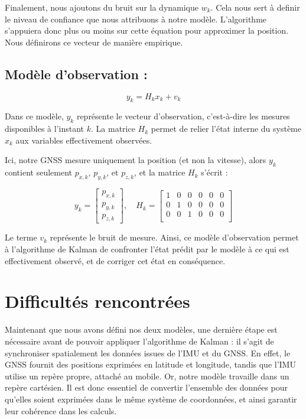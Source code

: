 Finalement, nous ajoutons du bruit sur la dynamique \( w_k \). Cela nous sert à definir le niveau de confiance que nous attribuons à notre modèle. L'algorithme s'appuiera donc plus ou moins sur cette équation pour approximer la position. Nous définirons ce vecteur de manière empirique.

\subsection*{Modèle d’observation :}
\[
y_k = H_k x_k + v_k
\]

Dans ce modèle, \( y_k \) représente le vecteur d'observation, c’est-à-dire les mesures disponibles à l’instant \( k \). 
La matrice \( H_k \) permet de relier l’état interne du système \( x_k \) aux variables effectivement observées.

Ici, notre GNSS mesure uniquement la position (et non la vitesse), alors \( y_k \) contient seulement \( p_{x,k} \), \( p_{y,k} \), et \( p_{z,k} \), et la matrice \( H_k \) s’écrit :

\[
y_k = 
\begin{bmatrix}
p_{x,k} \\
p_{y,k} \\
p_{z,k}
\end{bmatrix}
,\quad
H_k = 
\begin{bmatrix}
1 & 0 & 0 & 0 & 0 & 0 \\
0 & 1 & 0 & 0 & 0 & 0 \\
0 & 0 & 1 & 0 & 0 & 0 \\
\end{bmatrix}
\]

Le terme \( v_k \) représente le bruit de mesure. Ainsi, ce modèle d’observation permet à l’algorithme de Kalman de confronter l’état prédit par le modèle à ce qui est effectivement observé, et de corriger cet état en conséquence.

\section{Difficultés rencontrées}

Maintenant que nous avons défini nos deux modèles, une dernière étape est nécessaire avant de pouvoir appliquer l’algorithme de Kalman : il s’agit de synchroniser spatialement les données issues de l’IMU et du GNSS. En effet, le GNSS fournit des positions exprimées en latitude et longitude, tandis que l’IMU utilise un repère propre, attaché au mobile. Or, notre modèle travaille dans un repère cartésien. Il est donc essentiel de convertir l’ensemble des données pour qu’elles soient exprimées dans le même système de coordonnées, et ainsi garantir leur cohérence dans les calculs.


